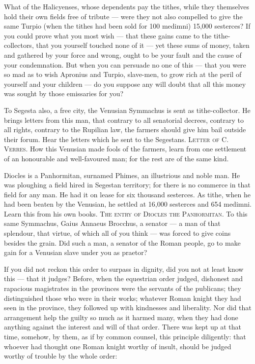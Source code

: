  What of the Halicyenses, whose dependents pay the tithes, while they themselves hold their own fields free of tribute --- were they not also compelled to give the same Turpio (when the tithes had been sold for 100 medimni) 15,000 sesterces? If you could prove what you most wish --- that these gains came to the tithe-collectors, that you yourself touched none of it --- yet these sums of money, taken and gathered by your force and wrong, ought to be your fault and the cause of your condemnation. But when you can persuade no one of this --- that you were so mad as to wish Apronius and Turpio, slave-men, to grow rich at the peril of yourself and your children --- do you suppose any will doubt that all this money was sought by those emissaries for you?

 To Segesta also, a free city, the Venusian Symmachus is sent as tithe-collector. He brings letters from this man, that contrary to all senatorial decrees, contrary to all rights, contrary to the Rupilian law, the farmers should give him bail outside their forum. Hear the letters which he sent to the Segestans. \textsc{Letter of C. Verres}. How this Venusian made fools of the farmers, learn from one settlement of an honourable and well-favoured man; for the rest are of the same kind.

 Diocles is a Panhormitan, surnamed Phimes, an illustrious and noble man. He was ploughing a field hired in Segestan territory; for there is no commerce in that field for any man. He had it on lease for six thousand sesterces. As tithe, when he had been beaten by the Venusian, he settled at 16,000 sesterces and 654 medimni. Learn this from his own books. \textsc{The entry of Diocles the Panhormitan}. To this same Symmachus, Gaius Annaeus Brocchus, a senator --- a man of that splendour, that virtue, of which all of you think --- was forced to give coins besides the grain. Did such a man, a senator of the Roman people, go to make gain for a Venusian slave under you as praetor?

 If you did not reckon this order to surpass in dignity, did you not at least know this --- that it judges? Before, when the equestrian order judged, dishonest and rapacious magistrates in the provinces were the servants of the publicans; they distinguished those who were in their works; whatever Roman knight they had seen in the province, they followed up with kindnesses and liberality. Nor did that arrangement help the guilty so much as it harmed many, when they had done anything against the interest and will of that order. There was kept up at that time, somehow, by them, as if by common counsel, this principle diligently: that whoever had thought one Roman knight worthy of insult, should be judged worthy of trouble by the whole order:

